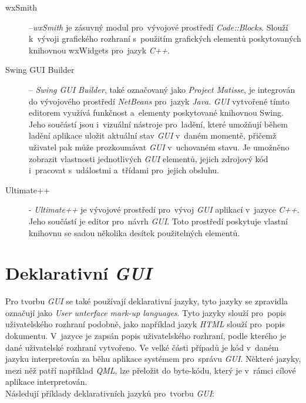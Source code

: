\documentclass[11pt,twoside,a4paper]{book}
\begin{document}
\begin{description}
\item [wxSmith] –\textit{wxSmith} je zásuvný modul pro~vývojové prostředí \textit{Code::Blocks}. Slouží k~vývoji grafického rozhraní s~použitím grafických elementů poskytovaných knihovnou wxWidgets pro~jazyk \textit{C++}. \cite{bib:wxSmith}
\item [Swing GUI Builder] – \textit{Swing GUI Builder}, také označovaný jako \textit{Project Matisse}, je integrován do vývojového prostředí \textit{NetBeans} pro~jazyk \textit{Java}.  \textit{GUI} vytvořené tímto editorem využívá funkčnost a~elementy poskytované knihovnou Swing. Jeho součástí jsou i~vizuální nástroje pro~ladění, které umožňují během ladění aplikace uložit aktuální stav \textit{GUI} v~daném momentě, přičemž uživatel pak může prozkoumávat \textit{GUI} v~uchovaném stavu. Je umožněno zobrazit vlastnosti jednotlivých \textit{GUI} elementů, jejich zdrojový kód i~pracovat s~událostmi a~třídami pro~jejich obsluhu. \cite{bib:swingBuilder}
\item[Ultimate++] - \textit{Ultimate++} je vývojové prostředí pro~vývoj \textit{GUI} aplikací v~jazyce \textit{C++}. Jeho součástí je editor pro~návrh \textit{GUI}. Toto prostředí poskytuje vlastní knihovnu se sadou několika desítek použitelných elementů. \cite{bib:ultimate}
\end{description}


\section{\label{SEC:declGUI}Deklarativní \textit{GUI}}
Pro tvorbu \textit{GUI} se také používají deklarativní jazyky, tyto jazyky se zpravidla označují jako \textit{User unterface mark-up languages}. Tyto jazyky slouží pro~popis uživatelského rozhraní podobně, jako například jazyk \textit{HTML} slouží pro~popis dokumentu. V~jazyce je zapsán popis uživatelského rozhraní, podle kterého je dané uživatelské rozhraní vytvořeno. Ve velké části případů je kód v~daném jazyku interpretován za běhu aplikace systémem pro~správu \textit{GUI}. Některé jazyky, mezi něž patří například \textit{QML}, lze přeložit do byte-kódu, který je v~rámci cílové aplikace interpretován.\\
Následují příklady deklarativních jazyků pro~tvorbu \textit{GUI}:
\end{document}
